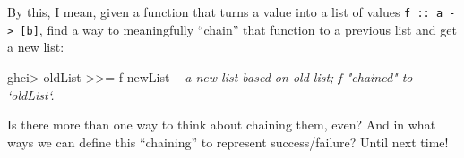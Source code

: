 \documentclass[]{article}
\newenvironment{Shaded}{}{}
\newcommand{\CommentTok}[1]{\textcolor[rgb]{0.38,0.63,0.69}{\textit{{#1}}}}
\newcommand{\FunctionTok}[1]{\textcolor[rgb]{0.02,0.16,0.49}{{#1}}}
\newcommand{\NormalTok}[1]{{#1}}
\begin{document}
By this, I mean, given a function that turns a value into a list of
values \texttt{f\ ::\ a\ -\textgreater{}\ {[}b{]}}, find a way to
meaningfully ``chain'' that function to a previous list and get a new
list:

\begin{Shaded}
\begin{Highlighting}[]
\NormalTok{ghci}\FunctionTok{>} \NormalTok{oldList }\FunctionTok{>>=} \NormalTok{f}
\NormalTok{newList             }\CommentTok{-- a new list based on old list; f "chained" to `oldList`.}
\end{Highlighting}
\end{Shaded}

Is there more than one way to think about chaining them, even? And in
what ways we can define this ``chaining'' to represent success/failure?
Until next time!
\end{document}
